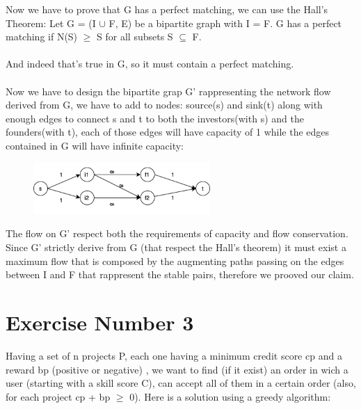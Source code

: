 \documentclass{article}
\begin{document}
Now we have to prove that G has a perfect matching, we can use the Hall's Theorem: Let G = (I {$\cup$} F, E) be a bipartite graph with {\textbar}I{\textbar} =  {\textbar}F{\textbar}. G has a perfect matching if {\textbar}N(S){\textbar} {$\geq$} {\textbar}S{\textbar} for all subsets S {$\subseteq$} F.\\\\And indeed that's true in G, so it must contain a perfect matching.\\\\Now we have to design the bipartite grap G' rappresenting the network flow derived from G, we have to add to nodes: source(s) and sink(t) along with enough edges to connect s and t to both the investors(with s) and the founders(with t), each of those edges will have capacity of 1 while the edges contained in G will have infinite capacity:

\begin{figure}[h]
		\centering
		\includegraphics[width=0.6\textwidth ]{DIG_EX1-AD}
\end{figure}

The flow on G' respect both the requirements of capacity and flow conservation. Since G' strictly derive from G (that respect the Hall's theorem) it must exist a maximum flow that is composed by the augmenting paths passing on the edges between I and F that rappresent the stable pairs, therefore we prooved our claim.
 \newpage
 
 \section{Exercise Number 3}
 
Having a set of n projects P, each one having a minimum credit score cp and a reward bp (positive or negative) , we want to find (if it exist) an order in wich a user (starting with a skill score C), can accept all of them in a certain order (also, for each project cp + bp {$\geq$} 0). Here is a solution using a greedy algorithm:
 
\end{document}
